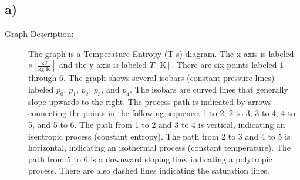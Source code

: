 

\subsection*{a)}

\begin{description}
    \item[Graph Description:] The graph is a Temperature-Entropy (T-s) diagram. The x-axis is labeled \( s \left[ \frac{\text{kJ}}{\text{kg K}} \right] \) and the y-axis is labeled \( T \left[ \text{K} \right] \). There are six points labeled 1 through 6. The graph shows several isobars (constant pressure lines) labeled \( p_0 \), \( p_1 \), \( p_2 \), \( p_3 \), and \( p_4 \). The isobars are curved lines that generally slope upwards to the right. The process path is indicated by arrows connecting the points in the following sequence: 1 to 2, 2 to 3, 3 to 4, 4 to 5, and 5 to 6. The path from 1 to 2 and 3 to 4 is vertical, indicating an isentropic process (constant entropy). The path from 2 to 3 and 4 to 5 is horizontal, indicating an isothermal process (constant temperature). The path from 5 to 6 is a downward sloping line, indicating a polytropic process. There are also dashed lines indicating the saturation lines.
\end{description}